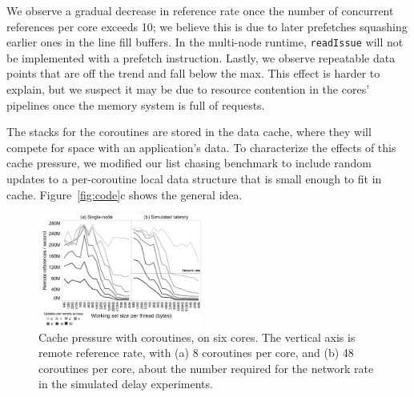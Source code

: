 \documentclass[10pt,nocopyrightspace]{sigplanconf}
\begin{document}
We observe a gradual decrease in reference rate once the number of
concurrent references per core exceeds 10; we believe this is due to
later prefetches squashing earlier ones in the line fill buffers. In
the multi-node runtime, \texttt{readIssue} will not be implemented
with a prefetch instruction. 
Lastly, we observe repeatable data points that are off the trend and fall below the max. This effect is harder to explain, but we suspect it may be
due to resource contention in the cores' pipelines once the memory
system is full of requests. 



The stacks for the coroutines are stored in the data cache, where they
will compete for space with an application's data. To characterize the
effects of this cache pressure, we modified our list chasing benchmark
to include random updates to a per-coroutine local data structure that
is small enough to fit in cache. Figure~\ref{fig:code}c shows the
general idea.

\begin{figure}[t]
  \begin{center}
    \includegraphics[width=0.48\textwidth]{figures/cachepressure-64to4M-edited2.pdf}
  \end{center}
  \caption{Cache pressure with coroutines, on six cores. The vertical
    axis is remote reference rate, with (a) 8 coroutines per core, and
    (b) 48 coroutines per core, about the number required for the
    network rate in the simulated delay experiments. }
  \vspace{-1.5pt} %
  \label{fig:cache-pressure}
\end{figure}
\end{document}
